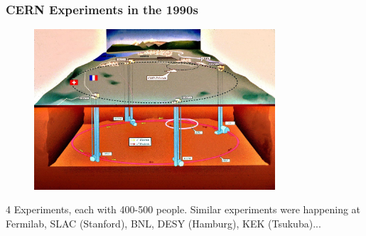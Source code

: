 \begin{frame}
\frametitle{CERN Experiments in the 1990s}

\begin{figure}[htbp]
\begin{center}
\includegraphics[width=0.8\textwidth]{images/LEP_schema.jpg}
\end{center}
\end{figure}

\small{4 Experiments, each with 400-500 people. Similar experiments were happening at Fermilab, SLAC (Stanford), BNL, DESY (Hamburg), KEK (Tsukuba)...}

\end{frame}


